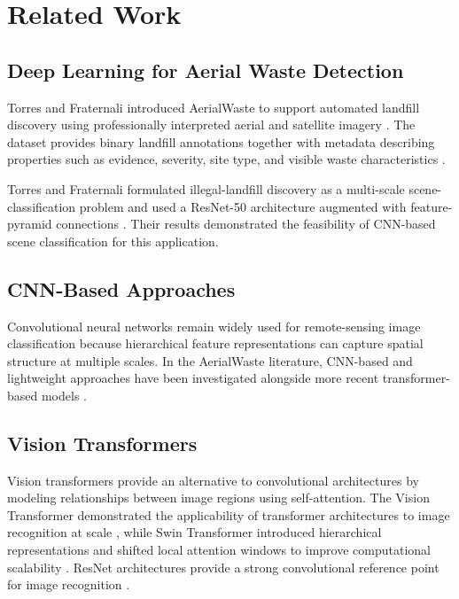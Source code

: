 \documentclass[journal]{IEEEtran}
\begin{document}
\section{Related Work}
\subsection{Deep Learning for Aerial Waste Detection}
Torres and Fraternali introduced AerialWaste to support automated landfill discovery using professionally interpreted aerial and satellite imagery \cite{torres2023aerialwaste}. The dataset provides binary landfill annotations together with metadata describing properties such as evidence, severity, site type, and visible waste characteristics \cite{torres2023aerialwaste}.

Torres and Fraternali formulated illegal-landfill discovery as a multi-scale scene-classification problem and used a ResNet-50 architecture augmented with feature-pyramid connections \cite{torres2021illegal}. Their results demonstrated the feasibility of CNN-based scene classification for this application.

\subsection{CNN-Based Approaches}
Convolutional neural networks remain widely used for remote-sensing image classification because hierarchical feature representations can capture spatial structure at multiple scales. In the AerialWaste literature, CNN-based and lightweight approaches have been investigated alongside more recent transformer-based models \cite{torres2021illegal,gibellini2025pipeline,sharmily2025landfill}.

\subsection{Vision Transformers}
Vision transformers provide an alternative to convolutional architectures by modeling relationships between image regions using self-attention. The Vision Transformer demonstrated the applicability of transformer architectures to image recognition at scale \cite{dosovitskiy2021vit}, while Swin Transformer introduced hierarchical representations and shifted local attention windows to improve computational scalability \cite{liu2021swin}. ResNet architectures provide a strong convolutional reference point for image recognition \cite{he2016resnet}.
\end{document}
